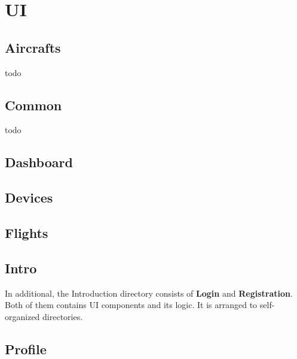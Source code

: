 \section{UI}\label{sec:ui}

\subsection{Aircrafts}\label{subsec:aircrafts}
todo

\subsection{Common}\label{subsec:common}
todo

\subsection{Dashboard}\label{subsec:dashboard}

\subsection{Devices}\label{subsec:devices}

\subsection{Flights}\label{subsec:flights}

\subsection{Intro}\label{subsec:intro}
In additional, the Introduction directory consists of \textbf{Login} and \textbf{Registration}.
Both of them contains UI components and its logic.
It is arranged to self-organized directories.

\subsection{Profile}\label{subsec:profile}
